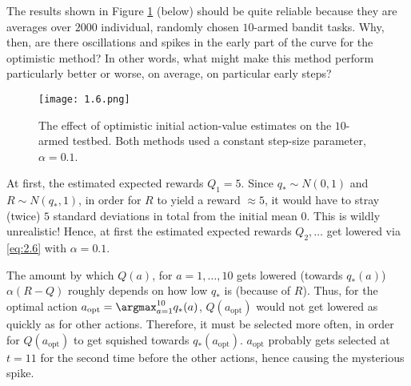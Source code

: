 
\begin{exercise}

The results shown in Figure \ref{fig:1.6} (below) should be quite reliable because they are averages over $2000$ individual, randomly chosen $10$-armed bandit tasks.
Why, then, are there oscillations and spikes in the early part of the curve for the optimistic method?
In other words, what might make this method perform particularly better or worse, on average, on particular early steps?

\setcounter{section}{2}
\setcounter{figure}{2}

\begin{figure}[H]
    \centering
    \texttt{[image: 1.6.png]}
    \caption
    {
        The effect of optimistic initial action-value estimates on the $10$-armed testbed.
        Both methods used a constant step-size parameter, $\alpha = 0.1$.
    }
    \label{fig:1.6}
\end{figure}

\setcounter{section}{1}

\end{exercise}


\begin{solution}

At first, the estimated expected rewards $Q_1 = 5$.
Since $q_\ast \sim N(0, 1)$ and $R \sim N(q_\ast, 1)$, in order for $R$ to yield a reward $\approx 5$, it would have to stray (twice) $5$ standard deviations in total from the initial mean $0$.
This is wildly unrealistic!
Hence, at first the estimated expected rewards $Q_2, \dots$ get lowered via \eqref{eq:2.6} with $\alpha = 0.1$.

The amount by which $Q(a)$, for $a = 1, \dots, 10$ gets lowered (towards $q_\ast(a)$) $\alpha (R - Q)$ roughly depends on how low $q_\ast$ is (because of $R$).
Thus, for the optimal action $a_\text{opt} = \argmax_{a=1}^{10} q_\ast(a)$, $Q(a_\text{opt})$ would not get lowered as quickly as for other actions.
Therefore, it must be selected more often, in order for $Q(a_\text{opt})$ to get squished towards $q_\ast(a_\text{opt})$.
$a_\text{opt}$ probably gets selected at $t = 11$ for the second time before the other actions, hence causing the mysterious spike.

\end{solution}

